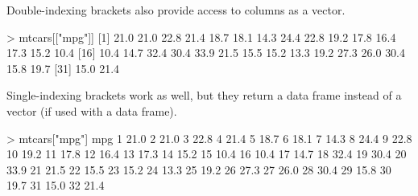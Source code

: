 \documentclass[
]{book}
\newenvironment{Shaded}{\begin{snugshade}}{\end{snugshade}}
\newcommand{\DecValTok}[1]{\textcolor[rgb]{0.00,0.00,0.81}{#1}}
\newcommand{\FloatTok}[1]{\textcolor[rgb]{0.00,0.00,0.81}{#1}}
\newcommand{\NormalTok}[1]{#1}
\newcommand{\SpecialCharTok}[1]{\textcolor[rgb]{0.00,0.00,0.00}{#1}}
\newcommand{\StringTok}[1]{\textcolor[rgb]{0.31,0.60,0.02}{#1}}
\begin{document}
Double-indexing brackets also provide access to columns as a vector.

\begin{Shaded}
\begin{Highlighting}[]
\SpecialCharTok{\textgreater{}}\NormalTok{ mtcars[[}\StringTok{"mpg"}\NormalTok{]]}
\NormalTok{ [}\DecValTok{1}\NormalTok{] }\FloatTok{21.0} \FloatTok{21.0} \FloatTok{22.8} \FloatTok{21.4} \FloatTok{18.7} \FloatTok{18.1} \FloatTok{14.3} \FloatTok{24.4} \FloatTok{22.8} \FloatTok{19.2} \FloatTok{17.8} \FloatTok{16.4} \FloatTok{17.3} \FloatTok{15.2} \FloatTok{10.4}
\NormalTok{[}\DecValTok{16}\NormalTok{] }\FloatTok{10.4} \FloatTok{14.7} \FloatTok{32.4} \FloatTok{30.4} \FloatTok{33.9} \FloatTok{21.5} \FloatTok{15.5} \FloatTok{15.2} \FloatTok{13.3} \FloatTok{19.2} \FloatTok{27.3} \FloatTok{26.0} \FloatTok{30.4} \FloatTok{15.8} \FloatTok{19.7}
\NormalTok{[}\DecValTok{31}\NormalTok{] }\FloatTok{15.0} \FloatTok{21.4}
\end{Highlighting}
\end{Shaded}

Single-indexing brackets work as well, but they return a data frame instead of a vector (if used with a data frame).

\begin{Shaded}
\begin{Highlighting}[]
\SpecialCharTok{\textgreater{}}\NormalTok{ mtcars[}\StringTok{"mpg"}\NormalTok{]}
\NormalTok{    mpg}
\DecValTok{1}  \FloatTok{21.0}
\DecValTok{2}  \FloatTok{21.0}
\DecValTok{3}  \FloatTok{22.8}
\DecValTok{4}  \FloatTok{21.4}
\DecValTok{5}  \FloatTok{18.7}
\DecValTok{6}  \FloatTok{18.1}
\DecValTok{7}  \FloatTok{14.3}
\DecValTok{8}  \FloatTok{24.4}
\DecValTok{9}  \FloatTok{22.8}
\DecValTok{10} \FloatTok{19.2}
\DecValTok{11} \FloatTok{17.8}
\DecValTok{12} \FloatTok{16.4}
\DecValTok{13} \FloatTok{17.3}
\DecValTok{14} \FloatTok{15.2}
\DecValTok{15} \FloatTok{10.4}
\DecValTok{16} \FloatTok{10.4}
\DecValTok{17} \FloatTok{14.7}
\DecValTok{18} \FloatTok{32.4}
\DecValTok{19} \FloatTok{30.4}
\DecValTok{20} \FloatTok{33.9}
\DecValTok{21} \FloatTok{21.5}
\DecValTok{22} \FloatTok{15.5}
\DecValTok{23} \FloatTok{15.2}
\DecValTok{24} \FloatTok{13.3}
\DecValTok{25} \FloatTok{19.2}
\DecValTok{26} \FloatTok{27.3}
\DecValTok{27} \FloatTok{26.0}
\DecValTok{28} \FloatTok{30.4}
\DecValTok{29} \FloatTok{15.8}
\DecValTok{30} \FloatTok{19.7}
\DecValTok{31} \FloatTok{15.0}
\DecValTok{32} \FloatTok{21.4}
\end{Highlighting}
\end{Shaded}
\end{document}
